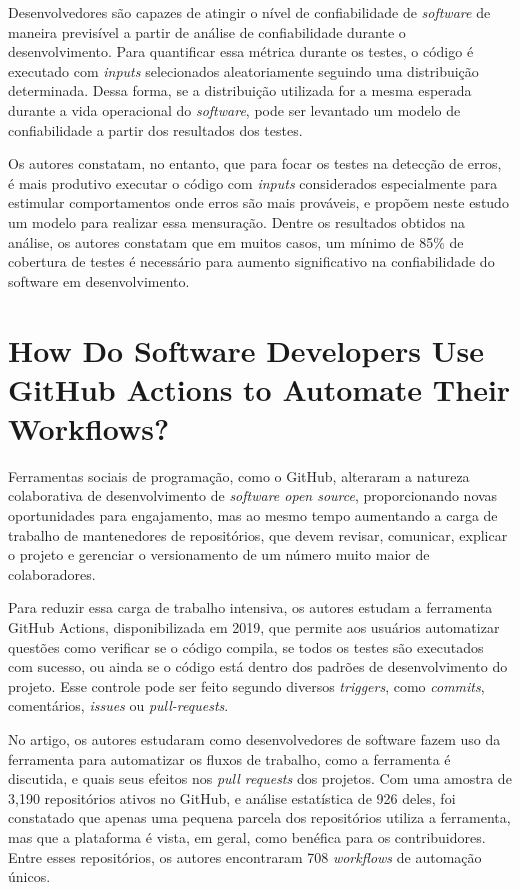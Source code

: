 Desenvolvedores são capazes de atingir o nível de confiabilidade de \textit{software} de maneira previsível a partir de análise de confiabilidade durante o desenvolvimento. Para quantificar essa métrica durante os testes, o código é executado com \textit{inputs} selecionados aleatoriamente seguindo uma distribuição determinada. Dessa forma, se a distribuição utilizada for a mesma esperada durante a vida operacional do \textit{software}, pode ser levantado um modelo de confiabilidade a partir dos resultados dos testes.

Os autores constatam, no entanto, que para focar os testes na detecção de erros, é mais produtivo executar o código com \textit{inputs} considerados especialmente para estimular comportamentos onde erros são mais prováveis, e propõem neste estudo um modelo para realizar essa mensuração. Dentre os resultados obtidos na análise, os autores constatam que  em muitos casos, um mínimo de 85\% de cobertura de testes é necessário para aumento significativo na confiabilidade do software em desenvolvimento.

\section{How Do Software Developers Use GitHub Actions
to Automate Their Workflows? \texorpdfstring{\cite{kinsman-2021}}{} }
\label{relacionados:kinsman-2021}
Ferramentas sociais de programação, como o GitHub, alteraram a natureza colaborativa de desenvolvimento de \textit{software open source}, proporcionando novas oportunidades para engajamento, mas ao mesmo tempo aumentando a carga de trabalho de mantenedores de repositórios, que devem revisar, comunicar, explicar o projeto e gerenciar o versionamento de um número muito maior de colaboradores.

Para reduzir essa carga de trabalho intensiva, os autores estudam a ferramenta GitHub Actions, disponibilizada em 2019, que permite aos usuários automatizar questões como verificar se o código compila, se todos os testes são executados com sucesso, ou ainda se o código está dentro dos padrões de desenvolvimento do projeto. Esse controle pode ser feito segundo diversos \textit{triggers}, como \textit{commits}, comentários, \textit{issues} ou \textit{pull-requests}.

No artigo, os autores estudaram como desenvolvedores de software fazem uso da ferramenta para automatizar os fluxos de trabalho, como a ferramenta é discutida, e quais seus efeitos nos \textit{pull requests} dos projetos. Com uma amostra de 3,190 repositórios ativos no GitHub, e análise estatística de 926 deles, foi constatado que apenas uma pequena parcela dos repositórios utiliza a ferramenta, mas que a plataforma é vista, em geral, como benéfica para os contribuidores. Entre esses repositórios, os autores encontraram 708 \textit{workflows} de automação únicos.

